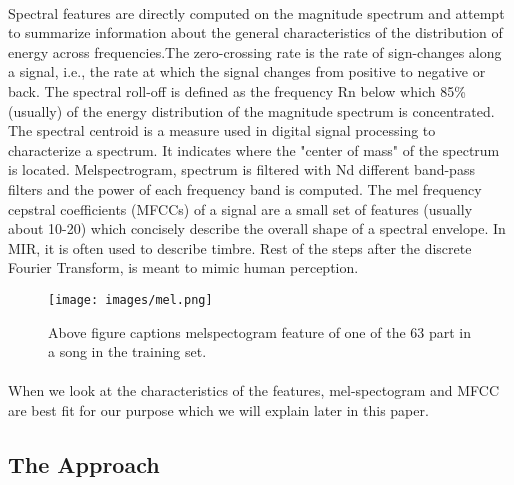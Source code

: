 \documentclass[10pt,twocolumn,letterpaper]{article}
\begin{document}
  \paragraph{}Spectral features are directly computed on the magnitude spectrum and attempt to summarize information about the general characteristics of the distribution of energy across frequencies.The zero-crossing rate is the rate of sign-changes along a signal, i.e., the rate at which the signal changes from positive to negative or back.
  The spectral roll-off is defined as the frequency Rn below which 85\% (usually) of the energy distribution of the magnitude spectrum is concentrated. The spectral centroid is a measure used in digital signal processing to characterize a spectrum. It indicates where the "center of mass" of the spectrum is located. Melspectrogram, spectrum is filtered with Nd different band-pass filters and the power of each frequency band is computed. The mel frequency cepstral coefficients (MFCCs) of a signal are a small set of features (usually about 10-20) which concisely describe the overall shape of a spectral envelope. In MIR, it is often used to describe timbre. Rest of the steps after the discrete Fourier Transform, is meant to mimic human perception.\cite{content_descriptor}
  
  \begin{figure}[t]
    \begin{center}
    \texttt{[image: images/mel.png]}
    \end{center}  
       \caption{Above figure captions melspectogram feature of one of the 63 part in a song in the training set.}
    \label{fig:mffc}
    \label{fig:onecol}
  \end{figure} 
  \paragraph{}When we look at the characteristics of the features, mel-spectogram and MFCC are best fit for our purpose which we will explain later in this paper. 
  
  \subsection{The Approach}
\end{document}
